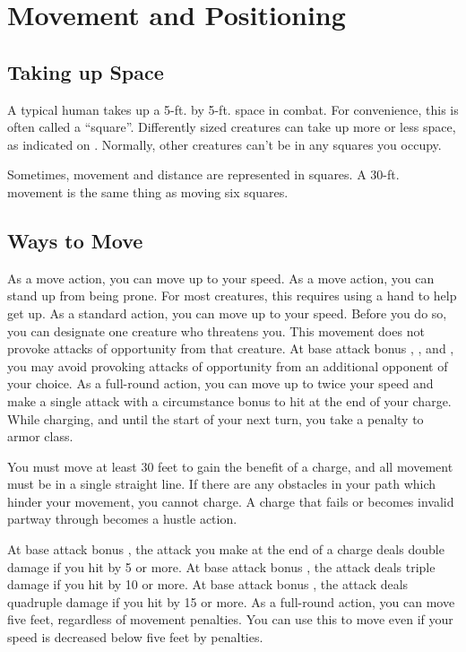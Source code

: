 \section{Movement and Positioning}\label{Movement and Positioning}

\subsection{Taking up Space}
A typical human takes up a 5-ft. by 5-ft. space in combat. For convenience, this is often called a ``square''. Differently sized creatures can take up more or less space, as indicated on . Normally, other creatures can't be in any squares you occupy.

Sometimes, movement and distance are represented in squares. A 30-ft. movement is the same thing as moving six squares.

\subsection{Ways to Move}

 As a move action, you can move up to your speed.
 As a move action, you can stand up from being prone. For most creatures, this requires using a hand to help get up.
\label{Withdraw} As a standard action, you can move up to your speed. Before you do so, you can designate one creature who threatens you. This movement does not provoke attacks of opportunity from that creature. At base attack bonus , , and , you may avoid provoking attacks of opportunity from an additional opponent of your choice.
\label{Charge} As a full-round action, you can move up to twice your speed and make a single attack with a  circumstance bonus to hit at the end of your charge. While charging, and until the start of your next turn, you take a  penalty to armor class.
\par You must move at least 30 feet to gain the benefit of a charge, and all movement must be in a single straight line. If there are any obstacles in your path which hinder your movement, you cannot charge. A charge that fails or becomes invalid partway through becomes a hustle action.
\par  At base attack bonus , the attack you make at the end of a charge deals double damage if you hit by 5 or more. At base attack bonus , the attack deals triple damage if you hit by 10 or more. At base attack bonus , the attack deals quadruple damage if you hit by 15 or more.
 As a full-round action, you can move five feet, regardless of movement penalties. You can use this to move even if your speed is decreased below five feet by penalties.

